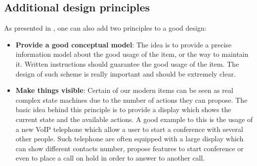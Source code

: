 \documentclass[a4paper,11pt] {article}
\theoremstyle{definition}
\begin{document}
\subsection{Additional design principles}
As presented in %
, one can also add two principles to a good design:
\begin{itemize}
\item \textbf{Provide a good conceptual model}: The idea is to provide a precise information model about the good usage of the item, or the way to maintain it. Written instructions should guarantee the good usage of the item. The design of such scheme is really important and should be extremely clear.
\item \textbf{Make things visible}: Certain of our modern items can be seen as real complex state machines due to the number of actions they can propose. The basic idea behind this principle is to provide a display which shows the current state and the available actions. A good example to this is the usage of a new VoIP telephone which allow a user to start a conference with several other people. Such telephone are often equipped with a large display which can show different contacts number, propose features to start conference or even to place a call on hold in order to answer to another call.
\end{itemize}
\end{document}
